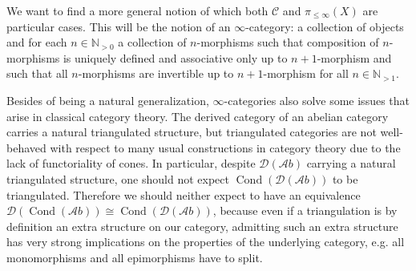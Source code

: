 \documentclass[11pt,A4]{article}
\theoremstyle{plain}
\theoremstyle{definition}
\theoremstyle{remark}
\newcommand{\N}{\mathbb{N}}
\newcommand{\1}{\mathbbm{1}}
\newcommand{\C}{\mathscr{C}}
\newcommand{\Ab}{\mathscr{A}b}
\newcommand{\D}{\mathscr{D}}
\DeclareMathOperator{\Cond}{Cond}
\begin{document}
We want to find a more general notion of which both $\C$ and $\pi_{\leqslant \infty}(X)$ are particular cases.
This will be the notion of an $\infty$-category: a collection of objects and for each $n\in \N_{>0}$ a collection of $n$-morphisms such that composition of $n$-morphisms is uniquely defined and associative only up to $n+1$-morphism and such that all $n$-morphisms are invertible up to $n+1$-morphism for all $n\in\N_{>1}$.

Besides of being a natural generalization, $\infty$-categories also solve some issues that arise in classical category theory.
The derived category of an abelian category carries a natural triangulated structure, but triangulated categories are not well-behaved with respect to many usual constructions in category theory due to the lack of functoriality of cones.
In particular, despite $\D(\Ab)$ carrying a natural triangulated structure, one should not expect $\Cond(\D(\Ab))$ to be triangulated.
Therefore we should neither expect to have an equivalence $\D(\Cond(\Ab))\cong \Cond(\D(\Ab))$, because even if a triangulation is by definition an extra structure on our category, admitting such an extra structure has very strong implications on the properties of the underlying category, e.g. all monomorphisms and all epimorphisms have to split.



\end{document}
